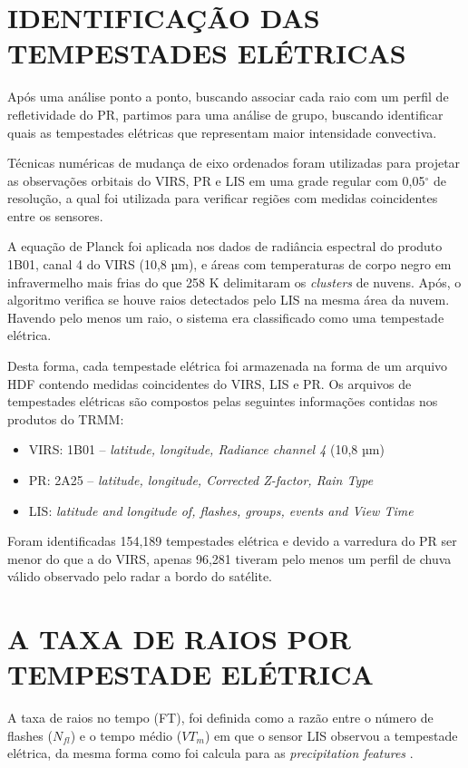 \section{IDENTIFICAÇÃO DAS TEMPESTADES ELÉTRICAS}

Após uma análise ponto a ponto, buscando associar cada raio com um perfil de refletividade do PR, partimos para uma análise de grupo, buscando identificar quais as tempestades elétricas que representam maior intensidade convectiva.

Técnicas numéricas de mudança de eixo ordenados foram utilizadas para projetar as
observações orbitais do VIRS, PR e LIS em uma grade regular com 0,05$^{\circ}$ de resolução, a qual foi utilizada para verificar regiões com medidas coincidentes entre os sensores.

A equação de Planck foi aplicada nos dados de radiância espectral do produto 1B01, canal 4 do VIRS (10,8 µm), e áreas com temperaturas de corpo negro em infravermelho mais frias do que 258 K delimitaram os \textit{clusters} de nuvens. Após, o algoritmo verifica se houve raios detectados pelo LIS na mesma área da nuvem. Havendo pelo menos um raio, o sistema era classificado como uma tempestade elétrica. 

Desta forma, cada tempestade elétrica foi armazenada na forma de um arquivo HDF contendo medidas coincidentes do VIRS, LIS e PR. Os arquivos de tempestades elétricas são compostos pelas seguintes informações contidas nos produtos do TRMM:

\begin{itemize}
\item VIRS: 1B01 -- \textit{latitude, longitude, Radiance channel 4} (10,8 µm)
\item PR: 2A25 -- \textit{latitude, longitude, Corrected Z-factor, Rain Type} 
\item LIS: \textit{latitude and longitude of, flashes, groups, events and View Time}  
\end{itemize} 

Foram identificadas 154,189 tempestades elétrica e devido a varredura do PR ser menor do que a do VIRS, apenas 96,281 tiveram pelo menos um perfil de chuva válido observado pelo radar a bordo do satélite.


\section{A TAXA DE RAIOS POR TEMPESTADE ELÉTRICA}

A taxa de raios no tempo (FT), foi definida como a razão entre o número de flashes ($N_{fl}$) e o tempo médio ($VT_m$) em que o sensor LIS observou a tempestade elétrica, da mesma forma como foi calcula para as \textit{precipitation features} \cite{cecil2005, Nesbitt2000}. 

